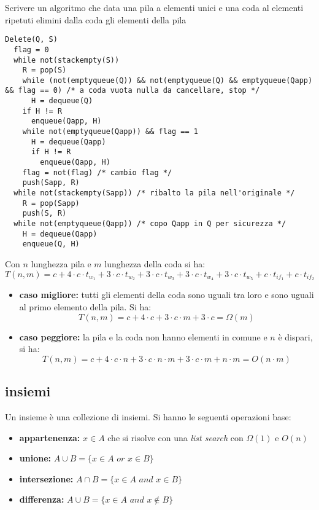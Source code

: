 \documentclass[a4paper,12pt,oneside,tikz]{book}
\begin{document}
\newpage
\begin{esercizio}
	Scrivere un algoritmo che data una pila a elementi unici e una coda al elementi ripetuti elimini dalla coda gli elementi della pila
	\begin{verbatim}
Delete(Q, S)
  flag = 0
  while not(stackempty(S))
    R = pop(S)
    while (not(emptyqueue(Q)) && not(emptyqueue(Q) && emptyqueue(Qapp)
&& flag == 0) /* a coda vuota nulla da cancellare, stop */
      H = dequeue(Q)
    if H != R 
      enqueue(Qapp, H)
    while not(emptyqueue(Qapp)) && flag == 1
      H = dequeue(Qapp)
      if H != R
        enqueue(Qapp, H)
    flag = not(flag) /* cambio flag */
    push(Sapp, R)
  while not(stackempty(Sapp)) /* ribalto la pila nell'originale */
    R = pop(Sapp)
    push(S, R)
  while not(emptyqueue(Qapp)) /* copo Qapp in Q per sicurezza */
    H = dequeue(Qapp)
    enqueue(Q, H)
\end{verbatim}
	Con $n$ lunghezza pila e $m$ lunghezza della coda si ha:
	$$T(n,m)=c+4\cdot c\cdot t_{w_1}+3\cdot c\cdot t_{w_2}+3\cdot c \cdot t_{w_3}+3\cdot c\cdot t_{w_4}+3\cdot c\cdot t_{w_5}+c\cdot t_{if_1}+c\cdot t_{if_2}$$
	\begin{itemize}
		\item \textbf{caso migliore:} tutti gli elementi della coda sono uguali tra loro e sono uguali al primo elemento della pila. Si ha:
		      $$T(n,m)=c+4\cdot c+3\cdot c\cdot m+3\cdot c=\Omega(m)$$
		\item \textbf{caso peggiore:} la pila e la coda non hanno elementi in comune e $n$ è dispari, si ha:
		      $$T(n,m)=c+4\cdot c\cdot n+3\cdot c\cdot n\cdot m+3\cdot c\cdot m+n\cdot m=O(n\cdot m)$$
	\end{itemize}
\end{esercizio}
\newpage
\subsection{insiemi}
Un insieme è una collezione di insiemi. Si hanno le seguenti operazioni base:
\begin{itemize}
	\item \textbf{appartenenza:} $x\in A$ che si risolve con una \textit{list search} con $\Omega(1)$ e $O(n)$
	\item \textbf{unione:} $A\cup B=\{x\in A\,\, or\,\, x\in B\}$
	\item \textbf{intersezione:} $A\cap B=\{x\in A\,\, and\,\, x\in B\}$
	\item \textbf{differenza:} $A\cup B=\{x\in A\,\, and\,\, x\not\in B\}$
\end{itemize}
\end{document}
